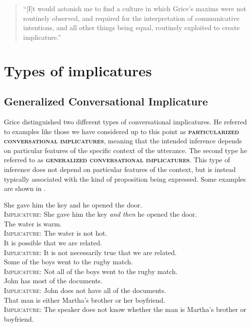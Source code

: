 \begin{quote}
“[I]t would astonish me to find a culture in which Grice’s maxims were not routinely observed, and required for the interpretation of communicative intentions, and all other things being equal, routinely exploited to create implicature.”
\end{quote}

\section{Types of implicatures}\label{sec:8.4}
\subsection{Generalized Conversational Implicature}\label{sec:8.4.1}

Grice distinguished two different types of conversational implicatures. He referred to examples like those we have considered up to this point as \textbf{\textsc{particularized conversational implicatures}}, meaning that the intended inference depends on particular features of the specific context of the utterance. The second type he referred to as \textbf{\textsc{generalized conversational implicatures}}. This type of inference does not depend on particular features of the context, but is instead typically associated with the kind of proposition being expressed. Some examples are shown in .


\ea \label{ex:8.14}
\ea  She gave him the key and he opened the door.\\
\textsc{Implicature}: She gave him the key \textit{and then} he opened the door.\\
\ex  The water is warm.\\
\textsc{Implicature}: The water is not hot.\\
\ex  It is possible that we are related.\\
\textsc{Implicature}: It is not necessarily true that we are related.\\
\ex  Some of the boys went to the rugby match.\\
\textsc{Implicature}: Not all of the boys went to the rugby match.\\
\ex   John has most of the documents.\\
\textsc{Implicature}: John does not have all of the documents.\\
\ex That man is either Martha’s brother or her boyfriend.\\
\textsc{Implicature}: The speaker does not know whether the man is Martha’s brother or boyfriend.\\
\z \z


